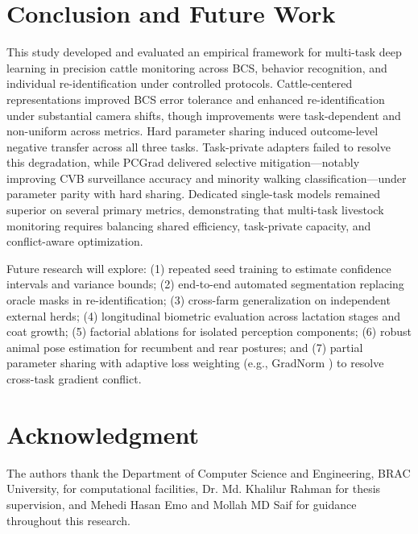 \documentclass[conference]{IEEEtran}
\begin{document}
\section{Conclusion and Future Work}
This study developed and evaluated an empirical framework for multi-task deep learning in precision cattle monitoring across BCS, behavior recognition, and individual re-identification under controlled protocols. Cattle-centered representations improved BCS error tolerance and enhanced re-identification under substantial camera shifts, though improvements were task-dependent and non-uniform across metrics. Hard parameter sharing induced outcome-level negative transfer across all three tasks. Task-private adapters failed to resolve this degradation, while PCGrad delivered selective mitigation---notably improving CVB surveillance accuracy and minority walking classification---under parameter parity with hard sharing. Dedicated single-task models remained superior on several primary metrics, demonstrating that multi-task livestock monitoring requires balancing shared efficiency, task-private capacity, and conflict-aware optimization.

Future research will explore: (1) repeated seed training to estimate confidence intervals and variance bounds; (2) end-to-end automated segmentation replacing oracle masks in re-identification; (3) cross-farm generalization on independent external herds; (4) longitudinal biometric evaluation across lactation stages and coat growth; (5) factorial ablations for isolated perception components; (6) robust animal pose estimation for recumbent and rear postures; and (7) partial parameter sharing with adaptive loss weighting (e.g., GradNorm \cite{chen2018gradnorm}) to resolve cross-task gradient conflict.

\section*{Acknowledgment}
The authors thank the Department of Computer Science and Engineering, BRAC University, for computational facilities, Dr. Md. Khalilur Rahman for thesis supervision, and Mehedi Hasan Emo and Mollah MD Saif for guidance throughout this research.

\balance


\end{document}
